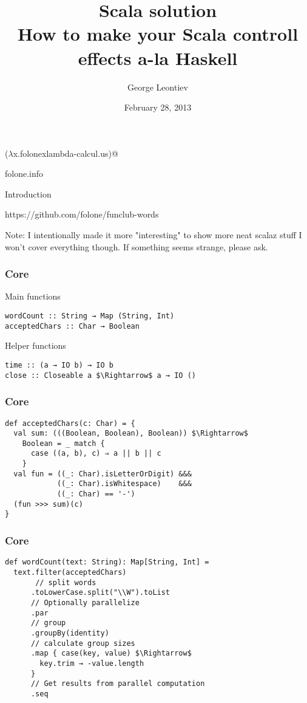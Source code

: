 \documentclass{beamer}
\title[Scala solution]{Scala solution\\How to make your Scala controll effects a-la Haskell}
\author{George Leontiev}
\institute{deltamethod GmbH}
\date{February 28, 2013}
\begin{document}
\begin{frame}
\titlepage
\centerline{($\lambda$x.folonexlambda-calcul.us)@}
\centerline{folone.info}
\end{frame}


\begin{frame}{Introduction}
  \Large \centerline{https://github.com/folone/funclub-words} \normalsize
  Note: I intentionally made it more "interesting" to show more neat scalaz stuff\newline
  I won't cover everything though. If something seems strange, please ask.
\end{frame}

\begin{frame}[fragile]
\frametitle{Core}
Main functions
\begin{lstlisting}[mathescape]
wordCount :: String → Map (String, Int)
acceptedChars :: Char → Boolean
\end{lstlisting}
Helper functions
\begin{lstlisting}[mathescape]
time :: (a → IO b) → IO b
close :: Closeable a $\Rightarrow$ a → IO ()
\end{lstlisting}
\end{frame}

\begin{frame}[fragile]
\frametitle{Core}
\begin{lstlisting}[mathescape]
def acceptedChars(c: Char) = {
  val sum: (((Boolean, Boolean), Boolean)) $\Rightarrow$
    Boolean = _ match {
      case ((a, b), c) ⇒ a || b || c
    }
  val fun = ((_: Char).isLetterOrDigit) &&&
            ((_: Char).isWhitespace)    &&&
            ((_: Char) == '-')
  (fun >>> sum)(c)
}
\end{lstlisting}
\end{frame}

\begin{frame}[fragile]
\frametitle{Core}
\begin{lstlisting}[mathescape]
def wordCount(text: String): Map[String, Int] =
  text.filter(acceptedChars)
       // split words
      .toLowerCase.split("\\W").toList
      // Optionally parallelize
      .par
      // group
      .groupBy(identity)
      // calculate group sizes
      .map { case(key, value) $\Rightarrow$
        key.trim → -value.length
      }
      // Get results from parallel computation
      .seq
\end{lstlisting}
\end{frame}
\end{document}

